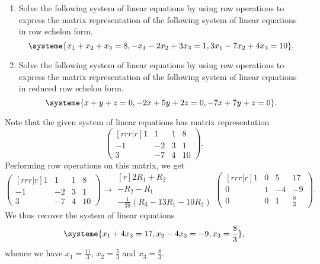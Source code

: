 \begin{problem}
    \begin{enumerate}
        \item Solve the following system of linear equations by using row operations to express the matrix representation of the following system of linear equations in row echelon form. \[\systeme{x_1 + x_2 + x_3 = 8, -x_1 - 2x_2 + 3x_3 = 1, 3x_1 - 7x_2 + 4x_3 = 10}.\]
        \item Solve the following system of linear equations by using row operations to express the matrix representation of the following system of linear equations in reduced row echelon form. \[\systeme{x + y + z = 0, -2x + 5y + 2z = 0, -7x+7y+z = 0}.\]
    \end{enumerate}
\end{problem}
\begin{solution}
    \begin{ppart}
        Note that the given system of linear equations has matrix representation \[\begin{pmatrix}[rrr|r]1 & 1 & 1 & 8\\ -1 & -2 & 3 & 1 \\ 3 & -7 & 4 & 10\end{pmatrix}.\] Performing row operations on this matrix, we get \[\begin{pmatrix}[rrr|r]1 & 1 & 1 & 8\\ -1 & -2 & 3 & 1 \\ 3 & -7 & 4 & 10\end{pmatrix} \rightarrow \begin{matrix}[r]\scriptstyle 2R_1 + R_2 \\ \scriptstyle -R_2 - R_1 \\ \scriptstyle -\frac1{39}(R_3 - 13R_1 - 10 R_2)\end{matrix}\begin{pmatrix}[rrr|r]1 & 0 & 5 & 17\\ 0 & 1 & -4 & -9 \\ 0 & 0 & 1 & \frac83\end{pmatrix}.\] We thus recover the system of linear equations \[\systeme{x_1 + 4x_3 = 17, x_2 - 4x_3 = -9, x_3 = \frac83},\] whence we have $x_1 = \frac{11}3$, $x_2 = \frac53$ and $x_3 = \frac83$.
    \end{ppart}
    \begin{ppart}

\end{ppart}
\end{solution}
